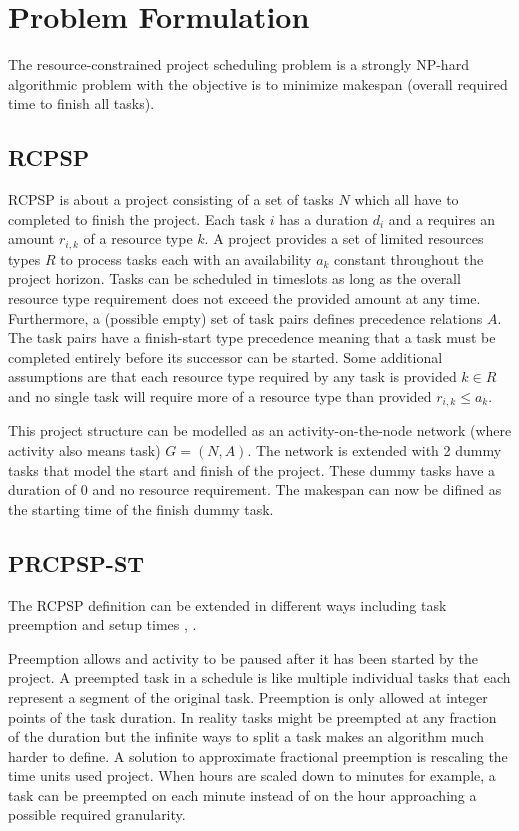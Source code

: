 \section{Problem Formulation}
The resource-constrained project scheduling problem is a strongly NP-hard algorithmic problem \cite{RN20} with the objective is to minimize makespan (overall required time to finish all tasks). 

\subsection{RCPSP}
RCPSP is about a project consisting of a set of tasks \(N\) which all have to completed to finish the project. Each task \(i\) has a duration \(d_i\) and a requires an amount \(r_{i,k}\) of a resource type \(k\). A project provides a set of limited resources types \(R\) to process tasks each with an availability \(a_k\) constant throughout the project horizon. Tasks can be scheduled in timeslots as long as the overall resource type requirement does not exceed the provided amount at any time. Furthermore, a (possible empty) set of  task pairs defines precedence relations \(A\). The task pairs have a finish-start type precedence meaning that a task must be completed entirely before its successor can be started. Some additional assumptions are that each resource type required by any task is provided \(k\in R\) and no single task will require more of a resource type than provided \(r_{i,k}\leq a_k\).

This project structure can be modelled as an activity-on-the-node network (where activity also means task) \(G=(N,A)\). The network is extended with 2 dummy tasks that model the start and finish of the project. These dummy tasks have a duration of 0 and no resource requirement. The makespan can now be difined as the starting time of the finish dummy task.

\subsection{PRCPSP-ST}
The RCPSP definition can be extended in different ways including task preemption and setup times \cite{RN6}, \cite{RN27}.

Preemption allows and activity to be paused after it has been started by the project. A preempted task in a schedule is like multiple individual tasks that each represent a segment of the original task. Preemption is only allowed at integer points of the task duration. In reality tasks might be preempted at any fraction of the duration but the infinite ways to split a task makes an algorithm much harder to define. A solution to approximate fractional preemption is rescaling the time units used project. When hours are scaled down to minutes for example, a task can be preempted on each minute instead of on the hour approaching a possible required granularity.

